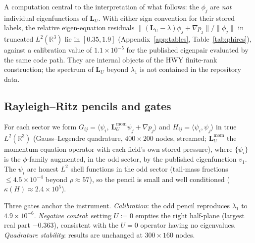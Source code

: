 \documentclass[11pt]{article}
\newcommand{\R}{\mathbb{R}}
\newcommand{\LU}{\mathbf{L}_{U}}
\theoremstyle{plain}
\theoremstyle{remark}
\begin{document}
A computation central to the interpretation of what follows: the
$\phi_j$ are \emph{not} individual eigenfunctions of $\LU$. With either
sign convention for their stored labels, the relative eigen-equation
residuals $\|(\LU-\lambda)\phi_j + \nabla p_j\|/\|\phi_j\|$ in truncated
$L^2(\R^3)$ lie in $[0.35, 1.9]$ (Appendix~\ref{app:tables},
Table~\ref{tab:phires}), against a calibration value of
$1.1\times 10^{-5}$ for the published eigenpair evaluated by the same
code path. They are internal objects of the HWY finite-rank
construction; the spectrum of $\LU$ beyond $\lambda_1$ is not contained
in the repository data.

\subsection{Rayleigh--Ritz pencils and gates}
For each sector we form $G_{ij} = \langle \psi_i,\ \LU^{\mathrm{mom}}
\psi_j + \nabla p_j\rangle$ and $H_{ij} = \langle\psi_i,\psi_j\rangle$
in true $L^2(\R^3)$ (Gauss--Legendre quadrature, $400\times 200$ nodes,
streamed; $\LU^{\mathrm{mom}}$ the momentum-equation operator with each
field's own stored pressure), where $\{\psi_i\}$ is the $\phi$-family
augmented, in the odd sector, by the published eigenfunction $v_1$. The
$\psi_i$ are honest $L^2$ shell functions in the odd sector (tail-mass
fractions $\le 4.5\times 10^{-4}$ beyond $\rho \approx 57$), so the
pencil is small and well conditioned ($\kappa(H)\approx 2.4\times 10^5$).

Three gates anchor the instrument. \emph{Calibration}: the odd pencil
reproduces $\lambda_1$ to $4.9\times 10^{-6}$. \emph{Negative control}:
setting $U:=0$ empties the right half-plane (largest real part
$-0.363$), consistent with the $U=0$ operator having no eigenvalues.
\emph{Quadrature stability}: results are unchanged at $300\times 160$
nodes.
\end{document}
